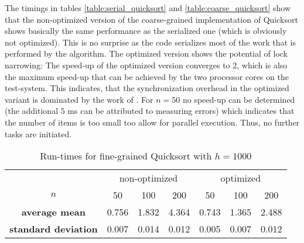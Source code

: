 The timings in tables \ref{table:serial_quicksort} and \ref{table:coarse_quicksort} show that the non-optimized version of the coarse-grained implementation of Quicksort shows basically the same performance as the serialized one (which is obviously not optimized). This is no surprise as the code serializes most of the work that is performed by the algorithm. The optimized version shows the potential of lock narrowing: The speed-up of the optimized version converges to 2, which is also the maximum speed-up that can be achieved by the two processor cores on the test-system. This indicates, that the synchronization overhead in the optimized variant is dominated by the work of . For $n = 50$ no speed-up can be determined (the additional $5$ ms can be attributed to measuring errors) which indicates that the number of items is too small too allow for parallel execution. Thus, no further tasks are initiated. 

\begin{table}[h!]
\begin{center}
\begin{tabular}{c |c|c|c||c|c|c|}
  \multicolumn{1}{c}{} & \multicolumn{3}{c}{non-optimized} & \multicolumn{3}{c}{optimized}\\ \cline{2-7}
  $n$ & 50 & 100 & 200 & 50 & 100 & 200\\ \cline{2-7}
  \textbf{average mean} & 0.756 & 1.832 & 4.364 & 0.743 & 1.365 & 2.488	\\ \cline{2-7}
  \textbf{standard deviation} & 0.007 & 0.014 & 0.012 & 0.005 & 0.007 & 0.012\\ \cline{2-7}
\end{tabular}
\caption{Run-times for fine-grained Quicksort with $h = 1000$}
\label{table:fine_quicksort}
\end{center}
\end{table}

